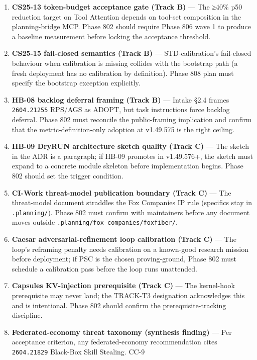 \documentclass[11pt,letterpaper]{article}
\newcommand{\arxivid}[1]{\texttt{\textcolor{accent}{#1}}}
\providecommand{\tightlist}{\setlength{\itemsep}{0pt}\setlength{\parskip}{0pt}}
\begin{document}
\begin{enumerate}
\def\labelenumi{\arabic{enumi}.}
\tightlist
\item
  \textbf{CS25-13 token-budget acceptance gate (Track B)} --- The ≥40\%
  p50 reduction target on Tool Attention depends on tool-set composition
  in the planning-bridge MCP. Phase 802 should require Phase 806 wave 1
  to produce a baseline measurement before locking the acceptance
  threshold.
\item
  \textbf{CS25-15 fail-closed semantics (Track B)} --- STD-calibration's
  fail-closed behaviour when calibration is missing collides with the
  bootstrap path (a fresh deployment has no calibration by definition).
  Phase 808 plan must specify the bootstrap exception explicitly.
\item
  \textbf{HB-08 backlog deferral framing (Track B)} --- Intake §2.4
  frames \arxivid{2604.21255} RPS/AGS as ADOPT, but task instructions
  force backlog deferral. Phase 802 must reconcile the public-framing
  implication and confirm that the metric-definition-only adoption at
  v1.49.575 is the right ceiling.
\item
  \textbf{HB-09 DryRUN architecture sketch quality (Track C)} --- The
  sketch in the ADR is a paragraph; if HB-09 promotes in v1.49.576+, the
  sketch must expand to a concrete module skeleton before implementation
  begins. Phase 802 should set the trigger condition.
\item
  \textbf{CI-Work threat-model publication boundary (Track C)} --- The
  threat-model document straddles the Fox Companies IP rule (specifics
  stay in \texttt{.planning/}). Phase 802 must confirm with maintainers
  before any document moves outside
  \texttt{.planning/fox-companies/foxfiber/}.
\item
  \textbf{Caesar adversarial-refinement loop calibration (Track C)} ---
  The loop's reframing penalty needs calibration on a known-good
  research mission before deployment; if PSC is the chosen
  proving-ground, Phase 802 must schedule a calibration pass before the
  loop runs unattended.
\item
  \textbf{Capsules KV-injection prerequisite (Track C)} --- The
  kernel-hook prerequisite may never land; the TRACK-T3 designation
  acknowledges this and is intentional. Phase 802 should confirm the
  prerequisite-tracking discipline.
\item
  \textbf{Federated-economy threat taxonomy (synthesis finding)} --- Per
  acceptance criterion, any federated-economy recommendation cites
  \arxivid{2604.21829} Black-Box Skill Stealing. CC-9

\end{enumerate}
\end{document}
